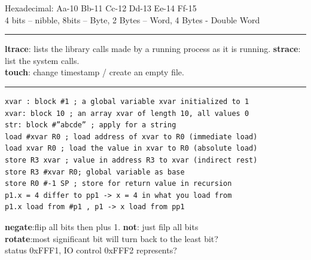 \documentclass[8pt,a4paper,landscape]{article}
\begin{document}
\small
\begin{spacing}{-1}
\begin{multicols*}{3}
    \noindent
    Hexadecimal: Aa-10  Bb-11  Cc-12  Dd-13  Ee-14  Ff-15 \\
    4 bits – nibble, 8bits – Byte, 2 Bytes – Word, 4 Bytes - Double Word\\
    \hrule \noindent
    \textbf{ltrace}: lists the library calls made by a running process as it is running. 
    \textbf{strace}: list the system calls.  \\
    \textbf{touch}: change timestamp / create an empty file.
    
    \hrule \noindent
\vspace*{-3mm}
\begin{verbatim}
xvar : block #1 ; a global variable xvar initialized to 1
xvar: block 10 ; an array xvar of length 10, all values 0
str: block #”abcde” ; apply for a string
load #xvar R0 ; load address of xvar to R0 (immediate load)
load xvar R0 ; load the value in xvar to R0 (absolute load)
store R3 xvar ; value in address R3 to xvar (indirect rest)
store R3 #xvar R0; global variable as base 
store R0 #-1 SP ; store for return value in recursion
p1.x = 4 differ to pp1 -> x = 4 in what you load from
p1.x load from #p1 , p1 -> x load from pp1  \end{verbatim}
\vspace*{-3mm}
    \textbf{negate}:flip all bits then plus 1. \textbf{not}: just filp all bits \\
    \textbf{rotate}:most significant bit will turn back to the least bit? \\
    status 0xFFF1, IO control 0xFFF2 represents? \\


\end{multicols*}
\end{spacing}
\end{document}
